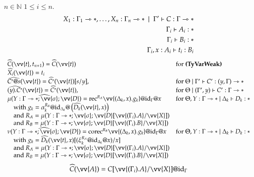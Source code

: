 \documentclass[a4paper,cleardoubleempty,BCOR1cm]{scrbook}
\begin{document}
\begin{definition}
   $n \in \mathbb{N}$  $1 \leq i \leq n$.
  \begin{align*}
    X_1 : \Gamma_1 \rat \ast,\ldots,X_n : \Gamma_n \rat \ast\ \mid\ \Gamma' \vdash C : \Gamma \rat \ast \\
    \Gamma_i \vdash A_i : \ast \\
    \Gamma_i \vdash B_i : \ast \\
    \Gamma_i, x : A_i \vdash t_i : B_i
  \end{align*}
  \begin{align*}
    \begin{array}{ll}
      \widehat{C}(\vv{t},t_{n+1}) = \widehat{C}(\vv{t})
      &\text{for \textbf{(TyVarWeak)}}\\
      \widehat{X_i}(\vv{t})=t_i\\
      \widehat{C'@s}(\vv{t})=\widehat{C'}(\vv{t})[s/y],
      &\text{for }\Theta\mid\Gamma'\vdash C':(y,\Gamma)\rat*\\
      \widehat{(y).C'}(\vv{t})=\widehat{C'}(\vv{t}),
      &\text{for }\Theta\mid(\Gamma',y)\vdash C':\Gamma\rat*\\
      \widehat{\mu(Y:\Gamma\rat*;\vv{\sigma};\vv{D})} =\text{rec}^{R_A}\vv{(\Delta_k,x).g_k}@\id{\Gamma}@x
      &\text{for } \Theta,Y:\Gamma\rat*\mid\Delta_k\vdash D_k:*\\
      \quad\text{with } g_k = \alpha_k^{R_B}@\id{\Delta_k}@\left(\widehat{D_k}(\vv{t},x)\right)\\
      \quad\text{and } R_A=\mu(Y:\Gamma\rat*;\vv{\sigma};\vv{D}[\vv{(\Gamma_i).A}/\vv{X}])\\
      \quad\text{and } R_B=\mu(Y:\Gamma\rat*;\vv{\sigma};\vv{D}[\vv{(\Gamma_i).B}/\vv{X}])\\
      \widehat{\nu(Y:\Gamma\rat*;\vv{\sigma};\vv{D})} =\text{corec}^{R_B}\vv{(\Delta_k,x).g_k}@\id{\Gamma}@x
      &\text{for } \Theta,Y:\Gamma\rat*\mid\Delta_k\vdash D_k:*\\
      \quad\text{with } g_k = \widehat{D_k}(\vv{t},x)[(\xi_k^{R_A}@\id{\Delta_k}@x)/x]\\
      \quad\text{and } R_A=\mu(Y:\Gamma\rat*;\vv{\sigma};\vv{D}[\vv{(\Gamma_i).A}/\vv{X}])\\
      \quad\text{and } R_B=\mu(Y:\Gamma\rat*;\vv{\sigma};\vv{D}[\vv{(\Gamma_i).B}/\vv{X}])\\
    \end{array}
  \end{align*}
  \begin{equation*}
    \widehat{C}(\vv{A})=C[\vv{(\Gamma_i).A}/\vv{X}]@\id{\Gamma}
  \end{equation*}
\end{definition}
\end{document}
